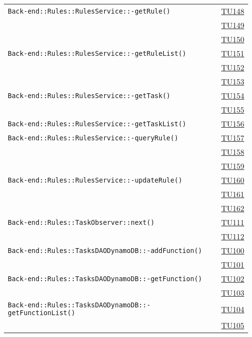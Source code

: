 \begin{longtable}{|>{\centering}m{12cm}|m{1cm}<{\centering}|}
\texttt{Back-end::Rules::RulesService::-\linebreak getRule()} & \hyperlink{TU148}{TU148}\\ & \hyperlink{TU149}{TU149}\\ & \hyperlink{TU150}{TU150}\\ \hline
\texttt{Back-end::Rules::RulesService::-\linebreak getRuleList()} & \hyperlink{TU151}{TU151}\\ & \hyperlink{TU152}{TU152}\\ & \hyperlink{TU153}{TU153}\\ \hline
\texttt{Back-end::Rules::RulesService::-\linebreak getTask()} & \hyperlink{TU154}{TU154}\\ & \hyperlink{TU155}{TU155}\\ \hline
\texttt{Back-end::Rules::RulesService::-\linebreak getTaskList()} & \hyperlink{TU156}{TU156}\\ \hline
\texttt{Back-end::Rules::RulesService::-\linebreak queryRule()} & \hyperlink{TU157}{TU157}\\ & \hyperlink{TU158}{TU158}\\ & \hyperlink{TU159}{TU159}\\ \hline
\texttt{Back-end::Rules::RulesService::-\linebreak updateRule()} & \hyperlink{TU160}{TU160}\\ & \hyperlink{TU161}{TU161}\\ & \hyperlink{TU162}{TU162}\\ \hline
\texttt{Back-end::Rules::TaskObserver::next()} & \hyperlink{TU111}{TU111}\\ & \hyperlink{TU112}{TU112}\\ \hline
\texttt{Back-end::Rules::TasksDAODynamoDB::-\linebreak addFunction()} & \hyperlink{TU100}{TU100}\\ & \hyperlink{TU101}{TU101}\\ \hline
\texttt{Back-end::Rules::TasksDAODynamoDB::-\linebreak getFunction()} & \hyperlink{TU102}{TU102}\\ & \hyperlink{TU103}{TU103}\\ \hline
\texttt{Back-end::Rules::TasksDAODynamoDB::-\linebreak getFunctionList()} & \hyperlink{TU104}{TU104}\\ & \hyperlink{TU105}{TU105}\\ \hline

\end{longtable}
